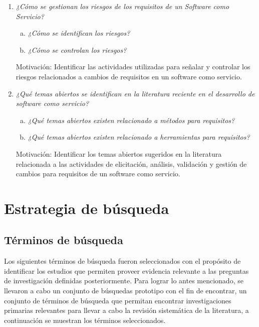 \documentclass{article}
\begin{document}
\begin{enumerate}[P 1.-]
  \item\emph{¿Cómo se gestionan los riesgos de los requisitos de un Software como Servicio?}
  \begin{enumerate}[(a)]
  \item \emph{¿Cómo se identifican los riesgos?}
  \item \emph{¿Cómo se controlan los riesgos?}
  \end{enumerate}
  Motivación: Identificar las actividades utilizadas para señalar y controlar los riesgos relacionados a cambios de requisitos en un software como servicio. 
  
  \item\emph{¿Qué temas abiertos se identifican en la literatura reciente en el desarrollo de software como servicio?}
  \begin{enumerate}[(a)]
  \item \emph{¿Qué temas abiertos existen relacionado a métodos para requisitos?}
  \item \emph{¿Qué temas abiertos existen relacionado a herramientas para requisitos?}
  \end{enumerate}
  Motivación: Identificar los temas abiertos sugeridos en la literatura relacionada a las actividades de elicitación, análisis, validación y gestión de cambios 
 para requisitos de un software como servicio.
\end{enumerate}

\newpage


\section{Estrategia de búsqueda}



\subsection{Términos de búsqueda}
Los siguientes términos de búsqueda fueron seleccionados con el propósito de identificar los estudios que 
permiten proveer evidencia relevante a las preguntas de investigación definidas posteriormente. 
Para lograr lo antes mencionado, se llevaron a cabo un conjunto de búsquedas prototipo con el fin de encontrar, 
un conjunto de términos de búsqueda que permitan encontrar investigaciones primarias relevantes para llevar a cabo
la revisión sistemática de la literatura, a continuación se muestran los términos seleccionados.
\end{document}
